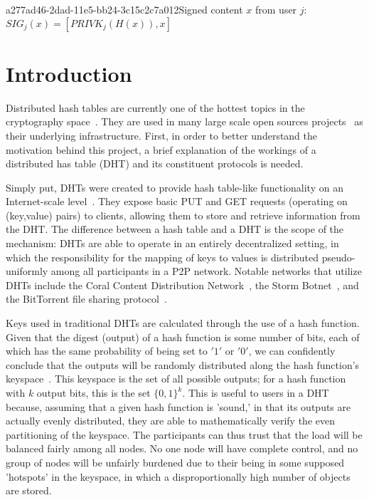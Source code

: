 \documentclass[12pt]{article}
\begin{document}
a277ad46-2dad-11e5-bb24-3c15c2c7a012Signed content $x$ from user $j$: $SIG_j(x) = \left[ PRIVK_j( H(x) ), x \right]$

\section{Introduction}
\par Distributed hash tables are currently one of the hottest topics in the cryptography space~\cite{Stoica:2001dj,Rowstron:2001ea,Ratnasamy:2001wn}. They are used in many large scale open sources projects~\cite{Freitas:2013tb,Xu:2010vs,Perfitt:2010fh} as their underlying infrastructure. First, in order to better understand the motivation behind this project, a brief explanation of the workings of a distributed has table (DHT) and its constituent protocols is needed.

\par Simply put, DHTs were created to provide hash table-like functionality on an Internet-scale level~\cite{Ratnasamy:2001wn}. They expose basic PUT and GET requests (operating on (key,value) pairs) to clients, allowing them to store and retrieve information from the DHT. The difference between a hash table and a DHT is the scope of the mechanism: DHTs are able to operate in an entirely decentralized setting, in which the responsibility for the mapping of keys to values is distributed pseudo-uniformly among all participants in a P2P network. Notable networks that utilize DHTs include the Coral Content Distribution Network~\cite{Freedman:2004vb}, the Storm Botnet~\cite{Holz:2008uk}, and the BitTorrent file sharing protocol~\cite{Cohen:y1_8mBnw}.

\par Keys used in traditional DHTs are calculated through the use of a hash function. Given that the digest (output) of a hash function is some number of bits, each of which has the same probability of being set to $'1'$ or $'0'$, we can confidently conclude that the outputs will be randomly distributed along the hash function's keyspace~. This keyspace is the set of all possible outputs; for a hash function with $k$ output bits, this is the set $\{0,1\}^k$. This is useful to users in a DHT because, assuming that a given hash function is 'sound,' in that its outputs are actually evenly distributed, they are able to mathematically verify the even partitioning of the keyspace. The participants can thus trust that the load will be balanced fairly among all nodes. No one node will have complete control, and no group of nodes will be unfairly burdened due to their being in some supposed 'hotspots' in the keyspace, in which a disproportionally high number of objects are stored.~
\end{document}
